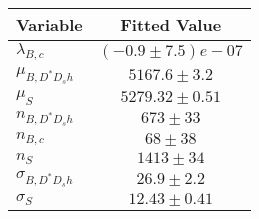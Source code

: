 \begin{tabular}[t]{lc}
\hline
Variable &Fitted Value\\
\hline\hline
$\lambda_{B,c}$&$(-0.9\pm7.5)e-07$\\
\hline
$\mu_{B, D^* D_s h}$&$5167.6\pm3.2$\\
\hline
$\mu_S$&$5279.32\pm0.51$\\
\hline
$n_{B, D^* D_s h}$&$673\pm33$\\
\hline
$n_{B,c}$&$68\pm38$\\
\hline
$n_S$&$1413\pm34$\\
\hline
$\sigma_{B, D^* D_s h}$&$26.9\pm2.2$\\
\hline
$\sigma_S$&$12.43\pm0.41$\\
\hline
\end{tabular}